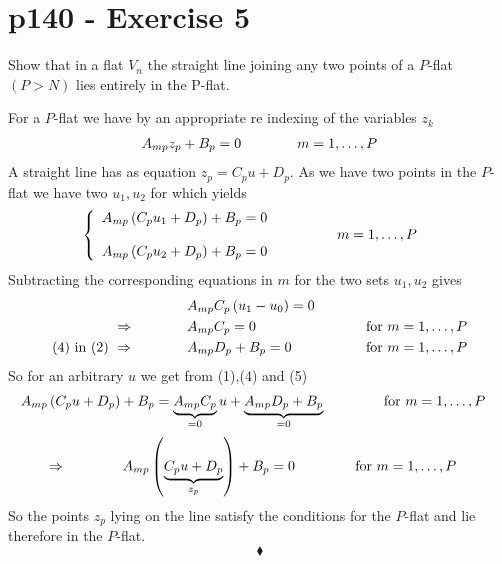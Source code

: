 \section{p140 - Exercise 5}
\begin{tcolorbox}
Show that in a flat $V_n$ the straight line joining any two points of a $P$-flat $(P>N)$ lies entirely in the P-flat.
\end{tcolorbox}
For a $P$-flat we have by an appropriate re indexing of the variables $z_k$
\begin{align}
A_{mp}z_p+B_p =0 \quad\quad\quad\quad m=1,\dots,P
\end{align}
A straight line has as equation $z_p=C_p u + D_p$. As we have two points in the $P$-flat we have two $u_1, u_2$ for which yields
\begin{align}
&\left\{ \begin{array}{ll}
A_{mp}\left(C_p u_1 + D_p\right) +B_p =0&\\
 & \quad\quad\quad\quad m=1,\dots,P\\
A_{mp}\left(C_p u_2 + D_p\right) +B_p =0& 
\end{array}\right.
\end{align} 
Subtracting the corresponding equations in $m$ for the two sets $u_1, u_2$ gives 
\begin{align}
&A_{mp}C_p\left( u_1-u_0 \right) =0&\\
\Rightarrow\quad\quad\quad\quad &A_{mp}C_p=0\quad\quad\quad\quad &\text{ for }m=1,\dots,P\\
\text{(4) in (2) }\Rightarrow\quad\quad\quad\quad &A_{mp}D_p +B_p =0 \quad\quad\quad\quad &\text{ for }m=1,\dots,P
\end{align} 
So for an arbitrary $u$ we get from (1),(4) and (5)
\begin{align}
A_{mp}\left(C_p u + D_p\right) +B_p = \underbrace{A_{mp}C_p}_{=0} u + \underbrace{A_{mp}D_p +B_p}_{=0} \quad\quad\quad\quad &\text{ for }m=1,\dots,P
\end{align}
\begin{align}
\Rightarrow\quad\quad\quad\quad A_{mp}\left(\underbrace{C_p u + D_p}_{z_p}\right) +B_p =0 \quad\quad\quad\quad &\text{ for }m=1,\dots,P
\end{align}
So the points $z_p$ lying on the line satisfy the conditions for the  $P$-flat and lie therefore in the  $P$-flat.
$$\blacklozenge$$
\newpage


